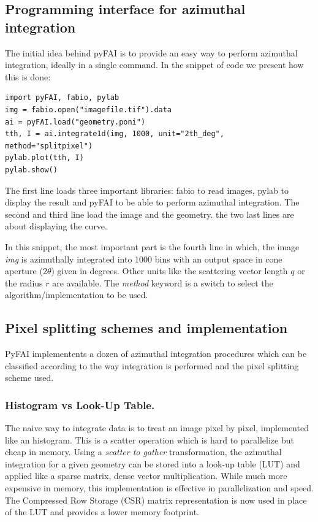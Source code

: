 \documentclass[preprint]{iucr}
\begin{document}
\subsection{Programming interface for azimuthal integration}

The initial idea behind pyFAI is to provide an easy way to perform azimuthal
integration, ideally in a single command. In the snippet of code we present how
this is done:

\begin{verbatim}
import pyFAI, fabio, pylab
img = fabio.open("imagefile.tif").data
ai = pyFAI.load("geometry.poni")
tth, I = ai.integrate1d(img, 1000, unit="2th_deg", method="splitpixel")
pylab.plot(tth, I)
pylab.show()
\end{verbatim}

The first line loads three important libraries: fabio \cite{fabio} to read
images, pylab \cite{matplotlib} to display the result and pyFAI to be able to
perform azimuthal integration.
The second and third line load the image and the geometry.
the two last lines are about displaying the curve.

In this snippet, the most important part is the fourth line in which, the image
\textit{img} is azimuthally integrated into 1000 bins with an output space in
cone aperture ($2\theta$) given in degrees. Other
units like the scattering vector length $q$ or the radius $r$ are available.
The \textit{method} keyword is a switch to select the algorithm/implementation
to be used.

\subsection{Pixel splitting schemes and implementation}

PyFAI implementents a dozen of azimuthal integration procedures which can be
classified according to the way integration is performed and the pixel
splitting scheme used.

\subsubsection{Histogram vs Look-Up Table.}
The naive way to integrate data is to treat an image pixel by pixel,
implemented like an histogram. This is a scatter operation which is hard to
parallelize but cheap in memory.
Using a \textit{scatter to gather} transformation, the azimuthal integration for
a given geometry can be stored into a look-up table (LUT) and applied like a
sparse matrix, dense vector multiplication.
While much more expensive in memory, this
implementation is effective in parallelization and speed.
The Compressed Row Storage (CSR) matrix representation is now used in place of
the LUT and provides a lower memory footprint.
\end{document}
